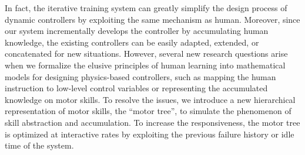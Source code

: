 In fact, the iterative training system can greatly simplify the design
process of dynamic controllers by exploiting the same mechanism as human.
Moreover, since our system incrementally develops the controller by
accumulating human knowledge, the existing controllers can be easily
adapted, extended, or concatenated for new situations.
However, several new research questions arise when we formalize the
elusive principles of human learning into mathematical models for
designing physics-based controllers, such as mapping the human instruction
to low-level control variables or representing the accumulated knowledge
on motor skills.
To resolve the issues, we introduce a new hierarchical representation 
of motor skills, the ``motor tree'', to simulate the phenomenon of
skill abstraction and accumulation. 
To increase the responsiveness, the motor tree is optimized at interactive
rates by exploiting the previous failure history or idle time of the system.

